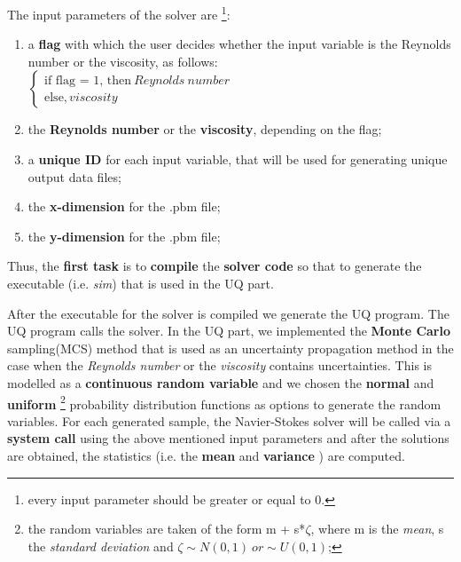 \documentclass[12pt,a4paper]{article}
\begin{document}
The input parameters of the solver are \footnote{every input parameter should be greater or equal to 0.}:
\begin{enumerate}
\item {a \textbf{flag} with which the user decides whether the input variable is the Reynolds number or the viscosity, as follows}: \\
$\left\{
  \begin{array}{ccl}
    \text{if flag = 1, then} \ Reynolds \ number \\
    \text{else}, viscosity 
  \end{array}
\right.$
\item {the \textbf{Reynolds number} or the \textbf{viscosity}, depending on the flag};
\item {a \textbf{unique ID} for each input variable, that will be used for generating unique output data files};
\item {the \textbf{x-dimension} for the .pbm file};
\item {the \textbf{y-dimension} for the .pbm file};
\end{enumerate}
%
Thus, the \textbf{first task} is to \textbf{compile} the \textbf{solver code} so that to generate the executable (i.e. \emph{sim}) that is used in the UQ part.
\newline

After the executable for the solver is compiled we generate the UQ program. The UQ program calls the solver. In the UQ part, we implemented the \textbf{Monte Carlo} sampling(MCS) method that is used as an uncertainty propagation method in the case when the \emph{Reynolds number} or the \emph{viscosity} contains uncertainties. This is modelled as a \textbf{continuous random variable} and we chosen the \textbf{normal} and \textbf{uniform} 
\footnote{the random variables are taken of the form m + s*$\zeta$, where m is the \textit{mean}, s the \textit{standard deviation} and $\zeta \sim N(0,1) \ or \sim U(0,1)$;} 
probability distribution functions as options to generate the random variables. For each generated sample, the Navier-Stokes solver will be called via a \textbf{system call} using the above mentioned input parameters and after the solutions are obtained, the statistics (i.e. the \textbf{mean} and \textbf{variance} ) are computed.
\end{document}
